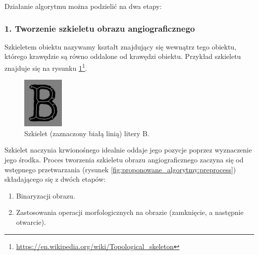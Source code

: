 Działanie algorytmu można podzielić na dwa etapy:

\subsubsection{1. Tworzenie szkieletu obrazu angiograficznego}

Szkieletem obiektu nazywamy kształt znajdujący się wewnątrz tego obiektu, którego krawędzie są równo oddalone od krawędzi obiektu. Przykład szkieletu znajduje się na rysunku \ref{fig:proponowane_algorytmy:skel}\footnote{\url{https://en.wikipedia.org/wiki/Topological_skeleton}}.

\begin{figure}[H]
  \centering
  \includegraphics[width=2cm]{gfx/skel}
  \caption{Szkielet (zaznaczony białą linią) litery B.}
  \label{fig:proponowane_algorytmy:skel}
\end{figure}

Szkielet naczynia krwionośnego idealnie oddaje jego pozycje poprzez wyznaczenie jego środka. Proces tworzenia szkieletu obrazu angiograficznego zaczyna się od wstępnego przetwarzania (rysunek \ref{fig:proponowane_algorytmy:preprocess}) składającego się z dwóch etapów:

\begin{enumerate}
\item Binaryzacji obrazu.
\item Zastosowania operacji morfologicznych na obrazie (zamknięcie, a następnie otwarcie).
\end{enumerate}

